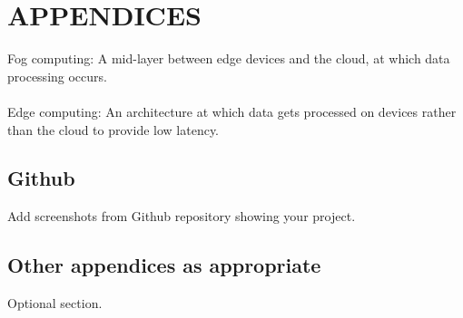 \documentclass[12pt]{article}
\begin{document}
\section{APPENDICES}
Fog computing: A mid-layer between edge devices and the cloud, at which data processing occurs. 
\\
\\
Edge computing: An architecture at which data gets processed on devices rather than the cloud to provide low latency.

\subsection{Github}
Add screenshots from Github repository showing your project.

\subsection{ Other appendices as appropriate}
Optional section.

\printbibliography
\end{document}
